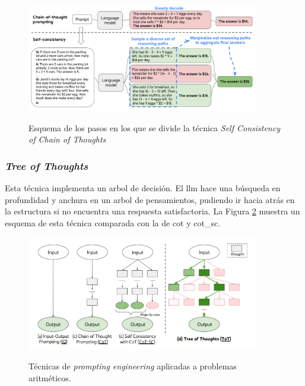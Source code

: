 \begin{figure}[H]
    \caption[]{Esquema de los pasos en los que se divide la técnica \textit{Self Consistency of Chain of Thoughts}}
    \centering
    \includegraphics[width=0.9\textwidth]{./figuras/cot_sc.png}
    \label{fig:cot_sc}
\end{figure}

\subsubsection{\textit{Tree of Thoughts}}

Esta técnica implementa un arbol de decisión. El \gls{llm} hace una búsqueda en profundidad y anchura en un arbol de pensamientos, pudiendo ir hacia atrás en la estructura si no encuentra una respuesta satisfactoria. La Figura \ref{fig:prompting_engineering} muestra un esquema de esta técnica comparada con la de \gls{cot} y \gls{cot_sc}.

\begin{figure}[H]
  \caption[Técnicas de \textit{prompting engineering}]{Técnicas de \textit{prompting engineering} aplicadas a problemas aritméticos.}
  \centering
  \includegraphics[width=0.9\textwidth]{./figuras/prompt_engineering_techniques.png}
  \label{fig:prompting_engineering}
\end{figure}











